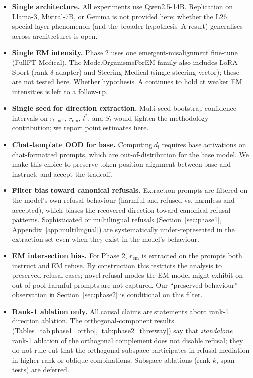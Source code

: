 \documentclass{article}
\newcommand{\rinst}{r_{l,\mathrm{inst}}}
\newcommand{\dinst}{d_{l}}
\newcommand{\rem}{r_{\mathrm{em}}}
\newcommand{\Sl}{S_{l}}
\begin{document}
\begin{itemize}\itemsep1pt
\item \textbf{Single architecture.} All experiments use
Qwen2.5-14B. Replication on Llama-3, Mistral-7B, or Gemma is not
provided here; whether the L26 special-layer phenomenon (and the
broader hypothesis~A result) generalises across architectures is
open.
\item \textbf{Single EM intensity.} Phase 2 uses one
emergent-misalignment fine-tune (FullFT-Medical). The
ModelOrganismsForEM family also includes LoRA-Sport (rank-8
adapter) and Steering-Medical (single steering vector); these are
not tested here. Whether hypothesis~A continues to hold at weaker
EM intensities is left to a follow-up.
\item \textbf{Single seed for direction extraction.} Multi-seed
bootstrap confidence intervals on $\rinst$, $\rem$, $l^{*}$, and
$\Sl$ would tighten the methodology contribution; we report point
estimates here.
\item \textbf{Chat-template OOD for base.} Computing $\dinst$
requires base activations on chat-formatted prompts, which are
out-of-distribution for the base model. We make this choice to
preserve token-position alignment between base and instruct, and
accept the tradeoff.
\item \textbf{Filter bias toward canonical refusals.} Extraction
prompts are filtered on the model's own refusal behaviour
(harmful-and-refused vs. harmless-and-accepted), which biases the
recovered direction toward canonical refusal patterns. Sophisticated
or multilingual refusals (Section~\ref{sec:phase1},
Appendix~\ref{app:multilingual}) are systematically under-represented
in the extraction set even when they exist in the model's behaviour.
\item \textbf{EM intersection bias.} For Phase 2, $\rem$ is
extracted on the prompts both instruct and EM refuse. By
construction this restricts the analysis to preserved-refusal
cases; novel refusal modes the EM model might exhibit on
out-of-pool harmful prompts are not captured. Our ``preserved
behaviour'' observation in Section~\ref{sec:phase2} is conditional
on this filter.
\item \textbf{Rank-1 ablation only.} All causal claims are statements
about rank-1 direction ablation. The orthogonal-component results
(Tables~\ref{tab:phase1_ortho}, \ref{tab:phase2_threeway}) say that
\emph{standalone} rank-1 ablation of the orthogonal complement does
not disable refusal; they do not rule out that the orthogonal
subspace participates in refusal mediation in higher-rank or oblique
combinations. Subspace ablations (rank-$k$, span tests) are deferred.
\end{itemize}
\end{document}
